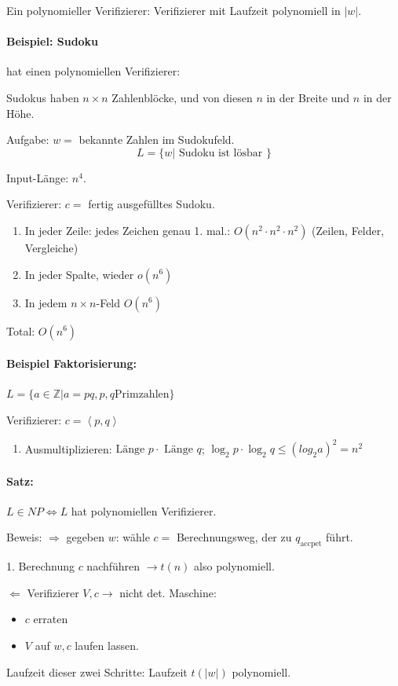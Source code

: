 Ein polynomieller Verifizierer: Verifizierer mit Laufzeit polynomiell in $|w|$.

\paragraph{Beispiel: Sudoku} hat einen polynomiellen Verifizierer:

Sudokus haben $n \times n$ Zahlenblöcke, und von diesen $n$ in der Breite und $n$ in der Höhe.

Aufgabe: $w =$ bekannte Zahlen im Sudokufeld.
\[
	L = \{ w | \text{ Sudoku ist lösbar }\}
\]

Input-Länge: $n^4$.

Verifizierer: $c = $ fertig ausgefülltes Sudoku.
\begin{enumerate}
	\item In jeder Zeile: jedes Zeichen genau 1. mal.: $O(n^2 \cdot  n^2 \cdot n^2)$ (Zeilen, Felder, Vergleiche)
	\item In jeder Spalte, wieder $o(n^6)$
	\item In jedem $n \times n$-Feld $O(n^6)$
\end{enumerate}
Total: $O(n^6)$

\paragraph{Beispiel Faktorisierung:} $L= \{ a \in \mathbb{Z} | a = pq, p,q \text{Primzahlen} \}$

Verifizierer: $c = \left<p,q\right>$

\begin{enumerate}
	\item Ausmultiplizieren: $\text{Länge } p \cdot \text{ Länge } q$; $\log_2{p} \cdot \log_2{q} \leq (log_2{a})^2 = n^2$
\end{enumerate}

\paragraph{Satz: } $L \in NP \Leftrightarrow L$ hat polynomiellen Verifizierer.

Beweis: $\Rightarrow$ gegeben $w$: wähle $c=$ Berechnungsweg, der zu $q_\text{accpet}$ führt.

1. Berechnung $c$ nachführen $\longrightarrow t(n)$ also polynomiell.

$\Leftarrow$ Verifizierer $V, c \rightarrow$ nicht det. Maschine:
\begin{itemize}
	\item $c$ erraten
	\item $V$ auf $w,c$ laufen lassen.
\end{itemize}
Laufzeit dieser zwei Schritte: Laufzeit $t(|w|)$ polynomiell.




